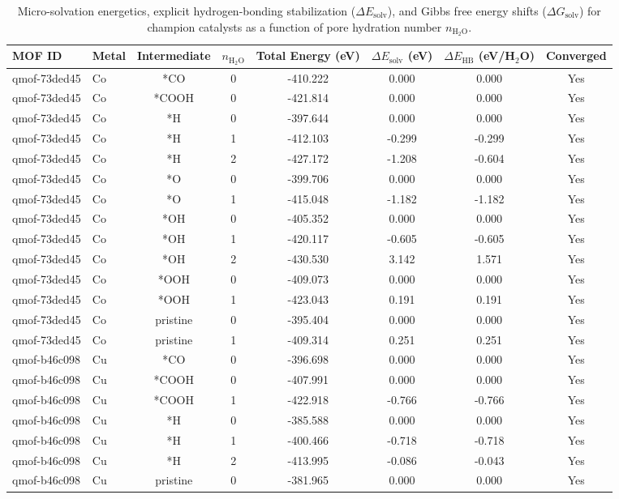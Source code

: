 \begin{table}[t]
\centering
\small
\caption{Micro-solvation energetics, explicit hydrogen-bonding stabilization ($\Delta E_{\mathrm{solv}}$), and Gibbs free energy shifts ($\Delta G_{\mathrm{solv}}$) for champion catalysts as a function of pore hydration number $n_{\mathrm{H_2O}}$.}
\label{tab:microsolvation_summary}
\begin{tabular}{llcccccc}
\hline\hline
MOF ID & Metal & Intermediate & $n_{\mathrm{H_2O}}$ & Total Energy (eV) & $\Delta E_{\mathrm{solv}}$ (eV) & $\Delta E_{\mathrm{HB}}$ (eV/H$_2$O) & Converged \\
\hline
qmof-73ded45 & Co & *CO & 0 & -410.222 & 0.000 & 0.000 & Yes \\
qmof-73ded45 & Co & *COOH & 0 & -421.814 & 0.000 & 0.000 & Yes \\
qmof-73ded45 & Co & *H & 0 & -397.644 & 0.000 & 0.000 & Yes \\
qmof-73ded45 & Co & *H & 1 & -412.103 & -0.299 & -0.299 & Yes \\
qmof-73ded45 & Co & *H & 2 & -427.172 & -1.208 & -0.604 & Yes \\
qmof-73ded45 & Co & *O & 0 & -399.706 & 0.000 & 0.000 & Yes \\
qmof-73ded45 & Co & *O & 1 & -415.048 & -1.182 & -1.182 & Yes \\
qmof-73ded45 & Co & *OH & 0 & -405.352 & 0.000 & 0.000 & Yes \\
qmof-73ded45 & Co & *OH & 1 & -420.117 & -0.605 & -0.605 & Yes \\
qmof-73ded45 & Co & *OH & 2 & -430.530 & 3.142 & 1.571 & Yes \\
qmof-73ded45 & Co & *OOH & 0 & -409.073 & 0.000 & 0.000 & Yes \\
qmof-73ded45 & Co & *OOH & 1 & -423.043 & 0.191 & 0.191 & Yes \\
qmof-73ded45 & Co & pristine & 0 & -395.404 & 0.000 & 0.000 & Yes \\
qmof-73ded45 & Co & pristine & 1 & -409.314 & 0.251 & 0.251 & Yes \\
qmof-b46c098 & Cu & *CO & 0 & -396.698 & 0.000 & 0.000 & Yes \\
qmof-b46c098 & Cu & *COOH & 0 & -407.991 & 0.000 & 0.000 & Yes \\
qmof-b46c098 & Cu & *COOH & 1 & -422.918 & -0.766 & -0.766 & Yes \\
qmof-b46c098 & Cu & *H & 0 & -385.588 & 0.000 & 0.000 & Yes \\
qmof-b46c098 & Cu & *H & 1 & -400.466 & -0.718 & -0.718 & Yes \\
qmof-b46c098 & Cu & *H & 2 & -413.995 & -0.086 & -0.043 & Yes \\
qmof-b46c098 & Cu & pristine & 0 & -381.965 & 0.000 & 0.000 & Yes \\
\hline\hline
\end{tabular}
\end{table}
